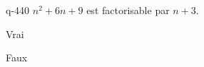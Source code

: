 \begin{truefalse}{q-440}
$n^2+6n+9$ est factorisable par $n+3$.
\item* Vrai
\item Faux
\end{truefalse}

